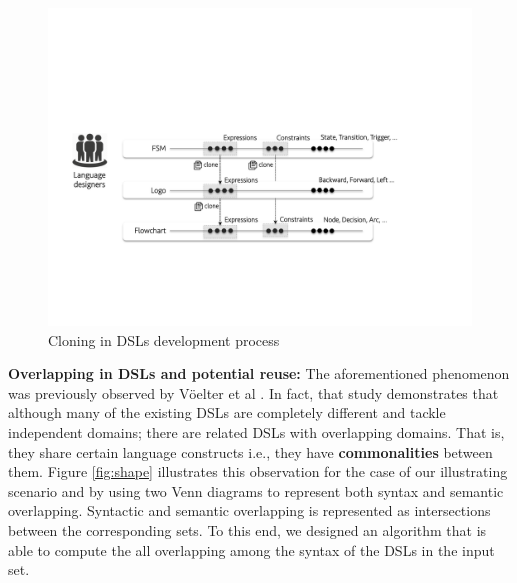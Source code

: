 \begin{figure}
\centering
\includegraphics[width=1\linewidth]{images/cloning.pdf}
\caption{Cloning in DSLs development process}
\label{fig:cloning}
\end{figure}


\textbf{Overlapping in DSLs and potential reuse:} The aforementioned phenomenon was previously observed by V\"oelter et al \cite[p. 60-61]{voelter:2013}. In fact, that study demonstrates that although many of the existing DSLs are completely different and tackle independent domains; there are related DSLs with overlapping domains. That is, they share certain language constructs i.e., they have \textbf{commonalities} between them. Figure \ref{fig:shape} illustrates this observation for the case of our illustrating scenario and by using two Venn diagrams to represent both syntax and semantic overlapping. Syntactic and semantic overlapping is represented as intersections between the corresponding sets. To this end, we designed an algorithm that is able to compute the all overlapping among the syntax of the DSLs in the input set. 

